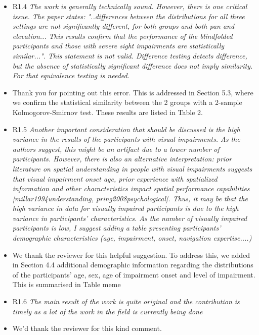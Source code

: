 \documentclass{scrartcl}
\begin{document}
\begin{itemize}
  \item R1.4 \textit{The work is generally technically sound. However, there is one critical issue. The paper states: "..differences between the distributions for all three settings are not significantly different, for both groups and both pan and elevation... This results confirm that the performance of the blindfolded participants and those with severe sight impairments are statistically similar...".
    This statement is not valid. Difference testing detects difference, but the absence of statistically significant difference does not imply similarity. For that equivalence testing is needed.}
  \item[] Thank you for pointing out this error.
    This is addressed in Section 5.3, where we confirm the statistical similarity between the 2 groups with a 2-sample Kolmogorov-Smirnov test. 
    These results are listed in Table 2.

  \item R1.5 \textit{Another important consideration that should be discussed is the high variance in the results of the participants with visual impairments. As the authors suggest, this might be an artifact due to a lower number of participants. However, there is also an alternative interpretation: prior literature on spatial understanding in people with visual impairments suggests that visual impairment onset age, prior experience with spatialized information and other characteristics impact spatial performance capabilities [millar1994understanding, pring2008psychological]. Thus, it may be that the high variance in data for visually impaired participants is due to the high variance in participants' characteristics. As the number of visually impaired participants is low, I suggest adding a table presenting participants' demographic characteristics (age, impairment, onset, navigation expertise....)}
  \item[] We thank the reviewer for this helpful suggestion.
    To address this, we added in Section 4.4 additional demographic information regarding the distributions of the participants' age, sex, age of impairment onset and level of impairment.
    This is summarised in Table meme

  \item R1.6 \textit{The main result of the work is quite original and the contribution is timely as a lot of the work in the field is currently being done}
  \item[] We'd thank the reviewer for this kind comment. 

\end{itemize}
\end{document}
